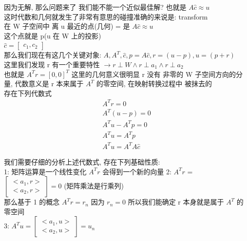 \documentclass[12pt]{article}
\begin{document}
\begin{flushleft}
    因为无解, 那么问题来了 我们能不能一个近似最佳解? 也就是 $A\hat{c} \approx u $\\

    这时代数和几何就发生了非常有意思的碰撞准确的来说是: transform \\
    在 W 子空间中 离 u 最近的点(几何) = 是 $A\hat{c} \approx u $ \\
    这个点就是 p(u 在 W 上的投影) \\
    $\hat{c} = \begin{bmatrix}
            c_{1},
            c_{2}
        \end{bmatrix}$ \\

    那么我们现在有这几个关键对象: $A, A^{T},\hat{c}, p = A\hat{c}, r = (u - p), u = (p + r) $ \\

    这里我们发现 r 有一个重要特性 $\to r \perp W  \land  r \perp a_{1} \land r \perp a_{2}$ \\
    也就是 $A^{T} r  = [0,0]^{T}$ 这里的几何意义很明显 r 没有 非零的 W 子空间方向的分量, 代数意义是 r 本来属于 $A^{T}$ 的零空间, 在映射转换过程中
    被抹去的 \\

    存在下列代数式
    \begin{align}
        A^{T}r = 0          \\
        A^{T}(u - p) = 0    \\
        A^{T}u - A^{T}p = 0 \\
        A^{T}u =  A^{T}p    \\
        A^{T}u = A^{T}A\hat{c}
    \end{align}

    我们需要仔细的分析上述代数式, 存在下列基础性质: \\
    1: 矩阵运算是一个线性变化 $A^{T}r$ 会得到一个新的向量
    2: $A^{T}r$ = $\begin{bmatrix}
            <a_{1},r> \\
            <a_{2},r>
        \end{bmatrix} = 0$ (矩阵乘法是行乘列) \\
    那么基于 1 的概念 $A^{T}r = r_{n}$ 因为 $r_{n} = 0$ 所以我们能确定 r 本身就是属于 $A^{T}$ 的零空间 \\
    3: $A^{T}u = \begin{bmatrix}
            <a_{1},u> \\
            <a_{2},u>
        \end{bmatrix} = u_{n}$ \\


\end{flushleft}
\end{document}
